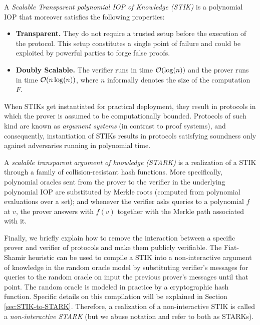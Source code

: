 \begin{definition}[STIK]
  A \textit{Scalable Transparent polynomial IOP of Knowledge (STIK)} is a polynomial IOP that moreover satisfies the following properties:
  \begin{itemize}
    \item \textbf{Transparent.} They do not require a trusted setup before the execution of the protocol. This setup constitutes a single point of failure and could be exploited by powerful parties to forge false proofs. 
    \item \textbf{Doubly Scalable.} The verifier runs in time $\mathcal{O}(\log(n))$ and the prover runs in time $\mathcal{O}(n\log(n))$, where $n$ informally denotes the size of the computation $F$.
  \end{itemize}
\end{definition}

When STIKs get instantiated for practical deployment, they result in protocols in which the prover is assumed to be computationally bounded. Protocols of such kind are known as \textit{argument systems} (in contrast to proof systems), and consequently, instantiation of STIKs results in protocols satisfying soundness only against adversaries running in polynomial time.
\begin{definition}[STARK]\label{def:STARK}
  A \textit{scalable transparent argument of knowledge (STARK)} is a realization of a STIK through a family of collision-resistant hash functions. More specifically, polynomial oracles sent from the prover to the verifier in the underlying polynomial IOP are substituted by Merkle roots (computed from polynomial evaluations over a set); and whenever the verifier asks queries to a polynomial $f$ at $v$, the prover answers with $f(v)$ together with the Merkle path associated with it. 
\end{definition}

Finally, we briefly explain how to remove the interaction between a specific prover and verifier of protocols and make them publicly verifiable. The Fiat-Shamir heuristic \cite{C:FiaSha86} can be used to compile a STIK into a non-interactive argument of knowledge in the random oracle model by substituting verifier's messages for queries to the random oracle on input the previous prover's messages until that point. The random oracle is modeled in practice by a cryptographic hash function. Specific details on this compilation will be explained in Section \ref{sec:STIK-to-STARK}. Therefore, a realization of a non-interactive STIK is called a \textit{non-interactive STARK} (but we abuse notation and refer to both as STARKs).




